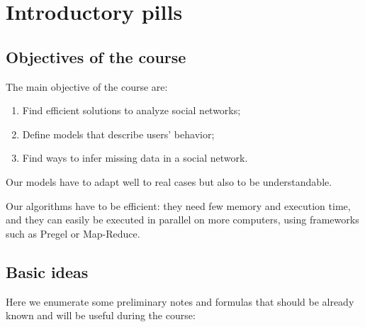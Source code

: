 
\chapter{Introductory pills}

\section{Objectives of the course}
    
    The main objective of the course are:
    \begin{enumerate}
        \item Find efficient solutions to analyze social networks;
        \item Define models that describe users' behavior;
        \item Find ways to infer missing data in a social network.
    \end{enumerate}

    Our models have to adapt well to real cases but also to be understandable.
    
    Our algorithms have to be efficient: they need few memory and execution time, and they can easily be executed in parallel on more computers, using frameworks such as Pregel or Map-Reduce.


\section{Basic ideas}

    Here we enumerate some preliminary notes and formulas that should be already known and will be useful during the course:
    
